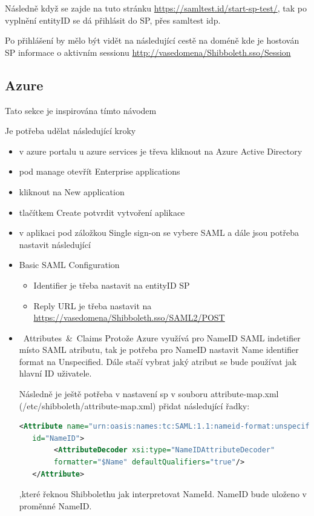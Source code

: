 Následně když se zajde na tuto stránku \url{https://samltest.id/start-sp-test/}, tak po vyplnění entityID se dá přihlásit do SP, přes samltest idp.

Po přihlášení by mělo být vidět na následující cestě na doméně kde je hostován SP informace o aktivním sessionu \url{http://vasedomena/Shibboleth.sso/Session} 



\subsection{Azure}

Tato sekce je inspirována tímto návodem\cite{AzureTutorial}


Je potřeba udělat následující kroky
\begin{itemize}
    \item v azure portalu u azure services je třeva kliknout na Azure Active Directory
    \item pod manage otevřít Enterprise applications
    \item kliknout na New application
    \item tlačítkem Create potvrdit vytvoření aplikace
    \item v aplikaci pod záložkou Single sign-on se vybere SAML a dále jsou potřeba nastavit následující
    \item Basic SAML Configuration
    \begin{itemize}
        \item Identifier je třeba nastavit na entityID SP
        \item Reply URL je třeba nastavit na \url{https://vasedomena/Shibboleth.sso/SAML2/POST}
    \end{itemize}
    \item \mbox{ Attributes \& Claims} \linebreak
    Protože Azure využívá pro NameID SAML indetifier místo SAML atributu, tak je potřeba pro NameID nastavit Name identifier format na Unspecified.
    Dále stačí vybrat jaký atribut se bude používat jak hlavní ID uživatele.
    
    Následně je ještě potřeba v nastavení sp v souboru attribute-map.xml (/etc/shibboleth/attribute-map.xml) přidat následující řadky:
    
    \begin{lstlisting}[language=XML]
   <Attribute name="urn:oasis:names:tc:SAML:1.1:nameid-format:unspecified"
   id="NameID">
        <AttributeDecoder xsi:type="NameIDAttributeDecoder" 
        formatter="$Name" defaultQualifiers="true"/>
   </Attribute>
\end{lstlisting}
,které řeknou Shibbolethu jak interpretovat NameId. NameID bude uloženo v proměnné NameID.


\end{itemize}
